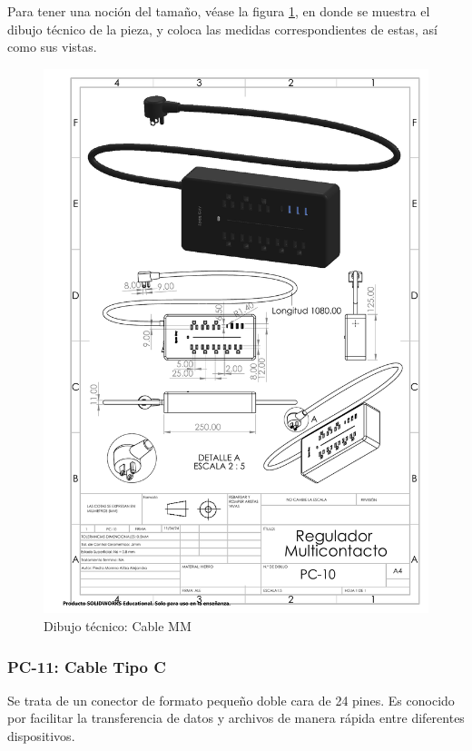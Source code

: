     
    Para tener una noción del tamaño, véase la figura \ref{fig:multicontacto}, en donde se muestra el dibujo técnico de la pieza, y coloca las medidas correspondientes de estas, así como sus vistas.
    \begin{figure}[H]
        \centering
        \includegraphics[trim = {7mm 1mm 1mm 1mm},clip,scale=0.4]{22/Img/multicontactoDibujo.pdf}
        \caption{Dibujo técnico: Cable MM}
        \label{fig:multicontacto}
    \end{figure}
    
    \subsubsection{PC-11: Cable Tipo C }
    Se trata de un conector de formato pequeño doble cara de 24 pines. Es conocido por facilitar la transferencia de datos y archivos de manera rápida entre diferentes dispositivos.
    

